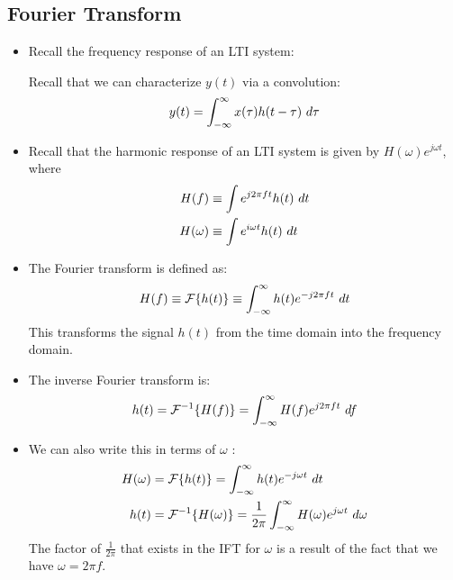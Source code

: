 \subsection{Fourier Transform} 
\begin{itemize}
	\item Recall the frequency response of an LTI system:
		\begin{center}
		\end{center}
		Recall that we can characterize \( y(t) \) via a convolution: 
		\[
		y(t) = \int_{-\infty}^{\infty} x(\tau) h(t - \tau) \ d  \tau 
		\] 
	\item Recall that the harmonic response of an LTI system is given by \( H(\omega) e^{j \omega t} \), where 
		\begin{align*}
			H(f) &\equiv \int e^{j 2\pi f t}h(t) \ d  t\\
			H(\omega) &\equiv \int e^{i \omega t} h(t) \ d t
		\end{align*}
	\item The Fourier transform is defined as:
		\[
		H(f) \equiv \mathcal F \{h(t)\} \equiv \int_{-\infty}^{\infty} h(t) e^{-j 2\pi ft }\ d  t 
		\] 
		This transforms the signal \( h(t)  \) from the time domain into the frequency domain.   
	\item The inverse Fourier transform is:
		\[
			h(t) = \mathcal F^{-1} \{H(f)\} = \int_{-\infty}^{\infty} H(f) e^{j 2\pi ft}\ d  f 
		\] 
	\item We can also write this in terms of \( \omega \) :
		\begin{align*}
			H(\omega) &= \mathcal F \{h(t)\} = \int_{-\infty}^{\infty} h(t) e^{-j \omega t} \ d t \\
			h(t) &= \mathcal F^{-1}\{H(\omega)\} = \frac{1}{2\pi}\int_{-\infty}^{\infty} H(\omega) e^{j \omega t}
			\ d \omega\\
	\end{align*}
	The factor of \( \frac{1}{2\pi} \) that exists in the IFT for \( \omega \) is a result of the fact that we have 
	\( \omega = 2\pi f \).
\end{itemize}
